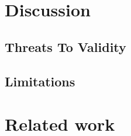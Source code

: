 \section{Discussion}
\label{s:discussion}

\subsection{Threats To Validity}
\label{s:threats}

\subsection{Limitations}
\label{s:limitations}

\section{Related work}
\label{sec:relatetd}


